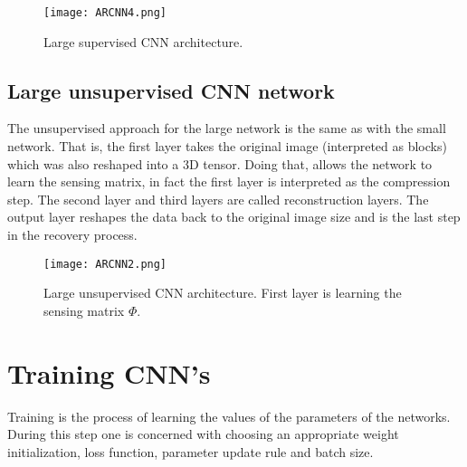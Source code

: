 \begin{figure}[!htb]
\centering 
\texttt{[image: ARCNN4.png]} 
\caption[Large supervised CNN architecture for recovery ]{Large supervised CNN architecture.}
\label{fig:ARCNNim4} 
\end{figure}

\subsection{Large unsupervised CNN network} \label{ch:betaNet}
The unsupervised approach for the large network is the same as with the small network. That is, the first layer takes the original image (interpreted as blocks) which was also reshaped into a 3D tensor. Doing that, allows the network to learn the sensing matrix, in fact the first layer is interpreted as the compression step. The second layer and third layers are called reconstruction layers. The output layer reshapes the data back to the original image size and is the last step in the recovery process.      
\vspace{1cm}    
\begin{figure}[!htb]
\centering 
\texttt{[image: ARCNN2.png]} 
\caption[Large unsupervised CNN architecture for recovery ]{Large unsupervised CNN architecture. First layer is learning the sensing matrix $\Phi$.}
\label{fig:ARCNNim2} 
\end{figure}

\FloatBarrier

\section{Training CNN's}
Training is the process of learning the values of the parameters of the networks. During this step one is concerned with choosing an appropriate weight initialization, loss function, parameter update rule and batch size.

\FloatBarrier

